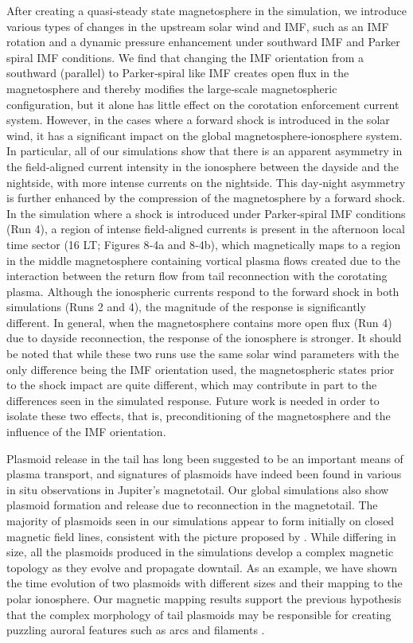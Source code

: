 After creating a quasi‐steady state magnetosphere in the simulation, we introduce various types of changes in the upstream solar wind and IMF, such as an IMF rotation and a dynamic pressure enhancement under southward IMF and Parker spiral IMF conditions. We find that changing the IMF orientation from a southward (parallel) to Parker‐spiral like IMF creates open flux in the magnetosphere and thereby modifies the large‐scale magnetospheric configuration, but it alone has little effect on the corotation enforcement current system. However, in the cases where a forward shock is introduced in the solar wind, it has a significant impact on the global magnetosphere‐ionosphere system. In particular, all of our simulations show that there is an apparent asymmetry in the field‐aligned current intensity in the ionosphere between the dayside and the nightside, with more intense currents on the nightside. This day‐night asymmetry is further enhanced by the compression of the magnetosphere by a forward shock. In the simulation where a shock is introduced under Parker‐spiral IMF conditions (Run 4), a region of intense field‐aligned currents is present in the afternoon local time sector (16 LT; Figures 8‐4a and 8‐4b), which magnetically maps to a region in the middle magnetosphere containing vortical plasma flows created due to the interaction between the return flow from tail reconnection with the corotating plasma. Although the ionospheric currents respond to the forward shock in both simulations (Runs 2 and 4), the magnitude of the response is significantly different. In general, when the magnetosphere contains more open flux (Run 4) due to dayside reconnection, the response of the ionosphere is stronger. It should be noted that while these two runs use the same solar wind parameters with the only difference being the IMF orientation used, the magnetospheric states prior to the shock impact are quite different, which may contribute in part to the differences seen in the simulated response. Future work is needed in order to isolate these two effects, that is, preconditioning of the magnetosphere and the influence of the IMF orientation. 

Plasmoid release in the tail has long been suggested to be an important means of plasma transport, and signatures of plasmoids have indeed been found in various in situ observations in Jupiter's magnetotail. Our global simulations also show plasmoid formation and release due to reconnection in the magnetotail. The majority of plasmoids seen in our simulations appear to form initially on closed magnetic field lines, consistent with the picture proposed by . While differing in size, all the plasmoids produced in the simulations develop a complex magnetic topology as they evolve and propagate downtail. As an example, we have shown the time evolution of two plasmoids with different sizes and their mapping to the polar ionosphere. Our magnetic mapping results support the previous hypothesis that the complex morphology of tail plasmoids may be responsible for creating puzzling auroral features such as arcs and filaments \cite{Grodent2003a,McComas2007,Nichols2009a}. 

